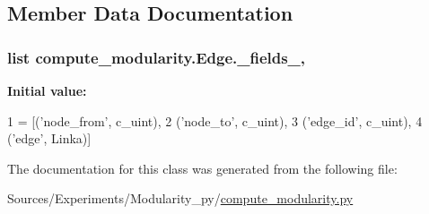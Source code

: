 \subsection{Member Data Documentation}
\hypertarget{classcompute__modularity_1_1_edge_a31cc6519f01650c1c69f2ccbafd841a1}{
\subsubsection[{\+\_\+fields\+\_\+}]{\setlength{\rightskip}{0pt plus 5cm}list compute\+\_\+modularity.\+Edge.\+\_\+fields\+\_\+\hspace{0.3cm}{\ttfamily [static]}, {\ttfamily [private]}}}\label{classcompute__modularity_1_1_edge_a31cc6519f01650c1c69f2ccbafd841a1}
{\bfseries Initial value\+:}
\begin{DoxyCode}
1 = [(\textcolor{stringliteral}{'node\_from'}, c\_uint),
2                 (\textcolor{stringliteral}{'node\_to'}, c\_uint),
3                 (\textcolor{stringliteral}{'edge\_id'}, c\_uint),
4                 (\textcolor{stringliteral}{'edge'}, Linka)]
\end{DoxyCode}


The documentation for this class was generated from the following file\+:\begin{DoxyCompactItemize}
\item 
Sources/\+Experiments/\+Modularity\+\_\+py/\hyperlink{compute__modularity_8py}{compute\+\_\+modularity.\+py}\end{DoxyCompactItemize}
